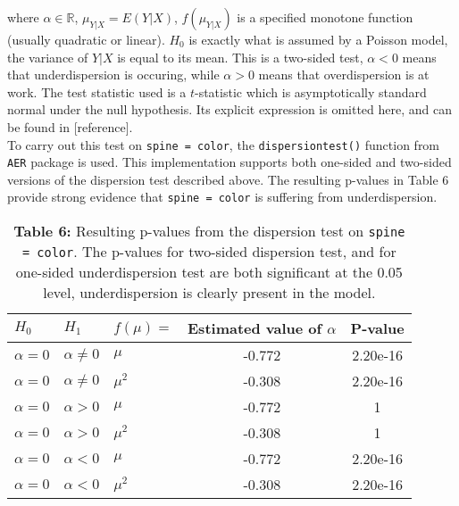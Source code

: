 \documentclass[a4paper, 12pt]{article}
\begin{document}
\noindent where $\alpha \in \mathbb{R}$, $\mu_{Y|X} = E(Y|X)$, $f(\mu_{Y|X})$ is a specified monotone function (usually quadratic or linear). $H_0$ is exactly what is assumed by a Poisson model, the variance of $Y|X$ is equal to its mean. This is a two-sided test, $\alpha < 0$ means that underdispersion is occuring, while $\alpha > 0$ means that overdispersion is at work. The test statistic used is a $t$-statistic which is asymptotically standard normal under the null hypothesis. Its explicit expression is omitted here, and can be found in [reference]. \\
\indent To carry out this test on \texttt{spine = color}, the \texttt{dispersiontest()} function from \texttt{AER} package is used. This implementation supports both one-sided and two-sided versions of the dispersion test described above. The resulting p-values in Table 6 provide strong evidence that \texttt{spine = color} is suffering from underdispersion.

\begin{table}[htbp]
  \centering
    \begin{tabular}{|p{5em}|p{5em}|p{6.78em}|c|c|}
    \toprule
    $H_0$    & $H_1$    & $f(\mu) = $ & \multicolumn{1}{p{9.555em}|}{Estimated value of $\alpha$} & \multicolumn{1}{p{4.78em}|}{P-value} \\
    \midrule
    \rowcolor[rgb]{ 1,  .949,  .8} $\alpha = 0$ & $\alpha \neq 0$ & $\mu$ & -0.772 & 2.20e-16 \\
    \rowcolor[rgb]{ 1,  .949,  .8}$\alpha = 0$ & $\alpha \neq 0$ & $\mu^2$ & -0.308 & 2.20e-16 \\
   $\alpha = 0$ & $\alpha > 0$ & $\mu$ & -0.772 & 1 \\
    $\alpha = 0$ & $\alpha > 0$ & $\mu^2$ & -0.308 & 1 \\
    \rowcolor[rgb]{ 1,  .949,  .8} $\alpha = 0$ & $\alpha < 0$ & $\mu$ & -0.772 & 2.20e-16 \\
    \rowcolor[rgb]{ 1,  .949,  .8} $\alpha = 0$ & $\alpha < 0$ & $\mu^2$ & -0.308 & 2.20e-16 \\
    \bottomrule
    \end{tabular}%
    \caption*{\textbf{Table 6:} Resulting p-values from the dispersion test on \texttt{spine = color}. The p-values for two-sided dispersion test, and for one-sided underdispersion test are both significant at the 0.05 level, underdispersion is clearly present in the model.  }
\end{table}%
\newpage
\end{document}
